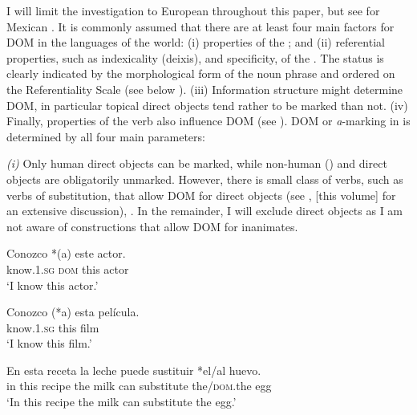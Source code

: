 \documentclass[output=paper]{LSP/langsci}
\begin{document}
I will limit the investigation to European  throughout this paper, but see \citet{Company2002Avance} for Mexican . It is commonly assumed that there are at least four main factors for DOM in the languages of the world: (i)  properties of the ; and (ii) referential properties, such as indexicality (deixis),  and specificity, of the . The  status is clearly indicated by the morphological form of the noun phrase and ordered on the Referentiality Scale (see below ). (iii) Information structure might determine DOM, in particular topical direct objects tend rather to be marked than not. (iv) Finally,  properties of the verb also influence DOM (see \citealt{Comrie1975Definite,Bossong1985Differentielle,Aissen2003Differential,deSwart2007Cross-linguistic,Iemmolo2010Topicality,Iemmoloetal2014Introduction,Witzlacketal2017Differential}). DOM or \textit{a}-marking in  is determined by all four main parameters: 

\textit{(i)} Only human direct objects can be marked, while non-human () and  direct objects are obligatorily unmarked. However, there is small class of verbs, such as verbs of substitution, that allow DOM for  direct objects (see \citealt{GarciaGarcia2014Objektmarkierung}, \citeyear{Garcia2017Nominal} [this volume] for an extensive discussion), \cf {}. In the remainder, I will exclude  direct objects as I am not aware of  constructions that allow DOM for inanimates.

\ea
\label{11-he-ex:12}

\gll Conozco *(a) este actor.\\
know.1.\textsc{sg} \textsc{dom} this actor\\
\glt ‘I know this actor.’
\z

\ea
\label{11-he-ex:13}

\gll Conozco (*a) esta película.\\
know.1.\textsc{sg} {} this film\\
\glt ‘I know this film.’
\z

\ea
\label{11-he-ex:14}

\gll En esta receta la leche puede sustituir *el/al huevo.\\
in this recipe the milk can substitute the/\textsc{dom}.the egg\\
\glt ‘In this recipe the milk can substitute the egg.’
\z
\end{document}
